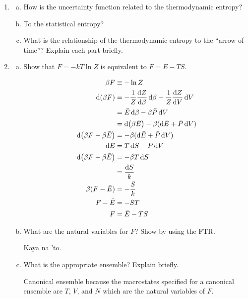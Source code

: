 \documentclass[9pt,a4paper,twocolumn]{article}
\begin{document}
\begin{enumerate}[1.]

	\item
	\begin{enumerate}[(a)]
	
		\item How is the uncertainty function related to the thermodynamic entropy?
		
		\item To the statistical entropy?
		
		\item What is the relationship of the thermodynamic entropy to the ``arrow of time''? Explain each part briefly.
	
	\end{enumerate}
	
	\item
	\begin{enumerate}[(a)]
	
		\item Show that $F = -kT\ln{Z}$ is equivalent to $F = E-TS$.
		
		\begin{align}
			\beta F &\equiv -\ln{Z} \\
			\dd(\beta F) &= -\frac{1}{Z}\dv{Z}{\beta}\dd{\beta} - \frac{1}{Z}\dv{Z}{V} \dd{V} \\
			&= \bar{E}\dd{\beta} - \beta\bar{P}\dd{V} \\
			&= \dd(\beta\bar{E}) - \beta(\dd{\bar{E}} + \bar{P}\dd{V}) \\
			\dd(\beta F - \beta\bar{E}) &= -\beta(\dd{\bar{E}} + \bar{P}\dd{V}) \\
			\dd{E} &= T\dd{S} - P\dd{V} \\
			\dd(\beta F - \beta\bar{E}) &= -\beta T\dd{S} \\
			&= \frac{\dd{S}}{k} \\
			\beta(F - \bar{E}) &= -\frac{S}{k} \\
			F - \bar{E} &= -ST \\
			F &= \bar{E} - TS
		\end{align}
		
		\item What are the natural variables for $F$? Show by using the FTR.
		
		Kaya na 'to.
		
		\item What is the appropriate ensemble? Explain briefly.
		
		Canonical ensemble because the macrostates specified for a canonical ensemble are $T$, $V$, and $N$ which are the natural variables of $F$.
	

\end{enumerate}
\end{enumerate}
\end{document}
